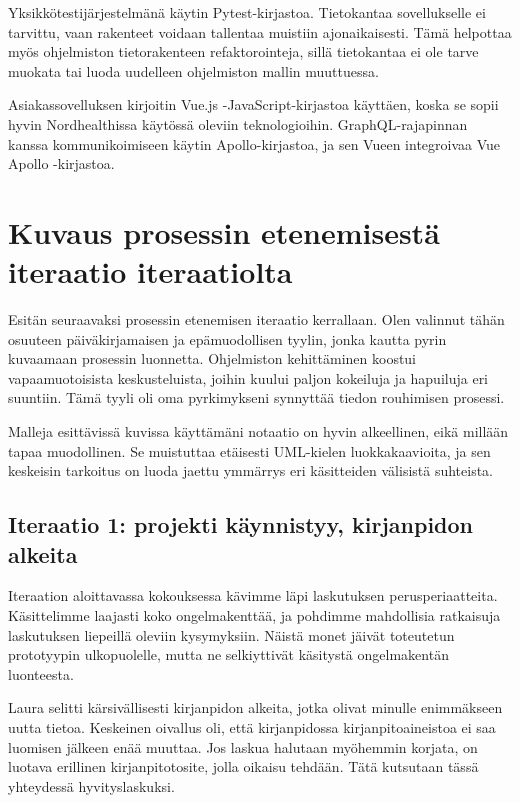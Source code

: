 Yksikkötestijärjestelmänä käytin Pytest-kirjastoa. Tietokantaa
sovellukselle ei tarvittu, vaan rakenteet voidaan tallentaa muistiin
ajonaikaisesti. Tämä helpottaa myös ohjelmiston tietorakenteen
refaktorointeja, sillä tietokantaa ei ole tarve muokata tai luoda
uudelleen ohjelmiston mallin muuttuessa.

Asiakassovelluksen kirjoitin Vue.js -JavaScript-kirjastoa käyttäen,
koska se sopii hyvin Nordhealthissa käytössä oleviin teknologioihin.
GraphQL-rajapinnan kanssa kommunikoimiseen käytin Apollo-kirjastoa, ja
sen Vueen integroivaa Vue Apollo -kirjastoa.

\hypertarget{kuvaus-prosessin-etenemisestuxe4-iteraatio-iteraatiolta}{%
\section{Kuvaus prosessin etenemisestä iteraatio
iteraatiolta}\label{kuvaus-prosessin-etenemisestuxe4-iteraatio-iteraatiolta}}

Esitän seuraavaksi prosessin etenemisen iteraatio kerrallaan. Olen
valinnut tähän osuuteen päiväkirjamaisen ja epämuodollisen tyylin, jonka
kautta pyrin kuvaamaan prosessin luonnetta. Ohjelmiston kehittäminen
koostui vapaamuotoisista keskusteluista, joihin kuului paljon kokeiluja
ja hapuiluja eri suuntiin. Tämä tyyli oli oma pyrkimykseni synnyttää
tiedon rouhimisen prosessi.

Malleja esittävissä kuvissa käyttämäni notaatio on hyvin alkeellinen,
eikä millään tapaa muodollinen. Se muistuttaa etäisesti UML-kielen
luokkakaavioita, ja sen keskeisin tarkoitus on luoda jaettu ymmärrys eri
käsitteiden välisistä suhteista.

\hypertarget{iteraatio-1-projekti-kuxe4ynnistyy-kirjanpidon-alkeita}{%
\subsection{Iteraatio 1: projekti käynnistyy, kirjanpidon
alkeita}\label{iteraatio-1-projekti-kuxe4ynnistyy-kirjanpidon-alkeita}}

Iteraation aloittavassa kokouksessa kävimme läpi laskutuksen
perusperiaatteita. Käsittelimme laajasti koko ongelmakenttää, ja
pohdimme mahdollisia ratkaisuja laskutuksen liepeillä oleviin
kysymyksiin. Näistä monet jäivät toteutetun prototyypin ulkopuolelle,
mutta ne selkiyttivät käsitystä ongelmakentän luonteesta.

Laura selitti kärsivällisesti kirjanpidon alkeita, jotka olivat minulle
enimmäkseen uutta tietoa. Keskeinen oivallus oli, että kirjanpidossa
kirjanpitoaineistoa ei saa luomisen jälkeen enää muuttaa. Jos laskua
halutaan myöhemmin korjata, on luotava erillinen kirjanpitotosite, jolla
oikaisu tehdään. Tätä kutsutaan tässä yhteydessä hyvityslaskuksi.

